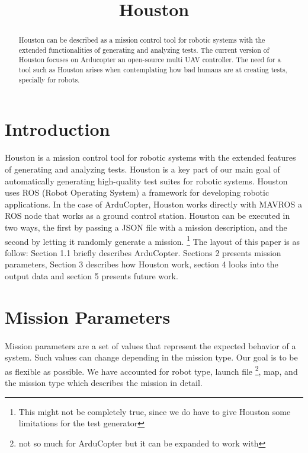 \documentclass[11pt, a4paper]{article}
\title{Houston}
\begin{document}
\maketitle
	
	
\begin{abstract}
Houston can be described as a mission control tool for robotic systems with the extended functionalities of generating and analyzing tests. The current version of Houston focuses on Arducopter an open-source multi UAV controller. The need for a tool such as Houston arises when contemplating how bad humans are at creating tests, specially for robots.
\end{abstract}
	
	
\section{Introduction}
Houston is a mission control tool for robotic systems with the extended features of generating and analyzing tests. Houston is a key part of our main goal of automatically generating high-quality test suites for robotic systems. Houston uses ROS (Robot Operating System) a framework for developing robotic applications. In the case of ArduCopter, Houston works directly with MAVROS a ROS node that works as a ground control station. Houston can be executed in two ways, the first by passing a JSON file with a mission description, and the second by letting it randomly generate a mission. \footnote{This might not be completely true, since we do have to give Houston some limitations for the test generator}  The layout of this paper is as follow: Section 1.1 briefly describes ArduCopter. Sections 2 presents mission parameters, Section 3 describes how Houston work, section 4 looks into the output data and section 5 presents future work. 


\section{Mission Parameters}
\paragraph{}
Mission parameters are a set of values that represent the expected behavior of a system. Such values can change depending in the mission type. Our goal is to be as flexible as possible. We have accounted for robot type, launch file \footnote{not so much for ArduCopter but it can be expanded to work with}, map, and the mission type which describes the mission in detail.
\end{document}
